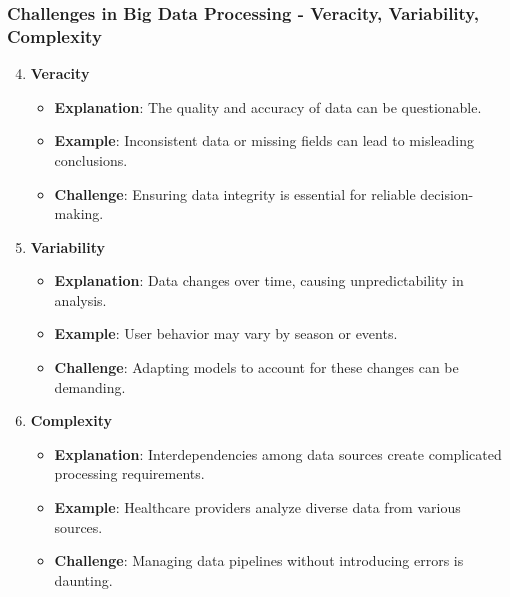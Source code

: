 \documentclass[aspectratio=169]{beamer}
\begin{document}
\begin{frame}[fragile]
    \frametitle{Challenges in Big Data Processing - Veracity, Variability, Complexity}
    \begin{enumerate}
        \setcounter{enumi}{3}
        \item \textbf{Veracity}
            \begin{itemize}
                \item \textbf{Explanation}: The quality and accuracy of data can be questionable.
                \item \textbf{Example}: Inconsistent data or missing fields can lead to misleading conclusions.
                \item \textbf{Challenge}: Ensuring data integrity is essential for reliable decision-making.
            \end{itemize}

        \item \textbf{Variability}
            \begin{itemize}
                \item \textbf{Explanation}: Data changes over time, causing unpredictability in analysis.
                \item \textbf{Example}: User behavior may vary by season or events.
                \item \textbf{Challenge}: Adapting models to account for these changes can be demanding.
            \end{itemize}

        \item \textbf{Complexity}
            \begin{itemize}
                \item \textbf{Explanation}: Interdependencies among data sources create complicated processing requirements.
                \item \textbf{Example}: Healthcare providers analyze diverse data from various sources.
                \item \textbf{Challenge}: Managing data pipelines without introducing errors is daunting.
            \end{itemize}
    \end{enumerate}
\end{frame}
\end{document}
